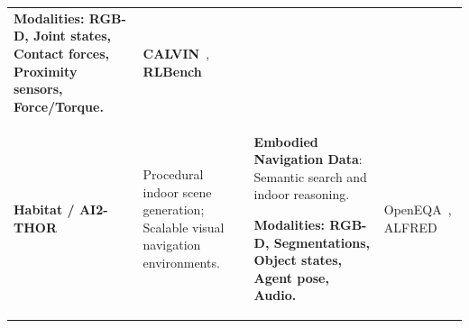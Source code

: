 \documentclass[acmsmall,screen,review]{acmart}
\begin{document}
\begin{table}[t]
{\begin{tabular}{@{}l >{\raggedright\arraybackslash}p{4.2cm} >{\raggedright\arraybackslash}p{5.8cm} >{\raggedright\arraybackslash}p{5.5cm}@{}}
\textbf{Modalities: RGB-D, Joint states, Contact forces, Proximity sensors, Force/Torque.} & \textbf{CALVIN}~\cite{mees2022calvin}, \textbf{RLBench}~\cite{james2020rlbench} \\

\textbf{Habitat / AI2-THOR} & Procedural indoor scene generation; Scalable visual navigation environments. & \textbf{Embodied Navigation Data}: Semantic search and indoor reasoning. 

\textbf{Modalities: RGB-D, Segmentations, Object states, Agent pose, Audio.} & OpenEQA~\cite{majumdar2024openeqa}, ALFRED~\cite{shridhar2020alfred} \\

\bottomrule
\end{tabular}}
\end{table}
\end{document}
